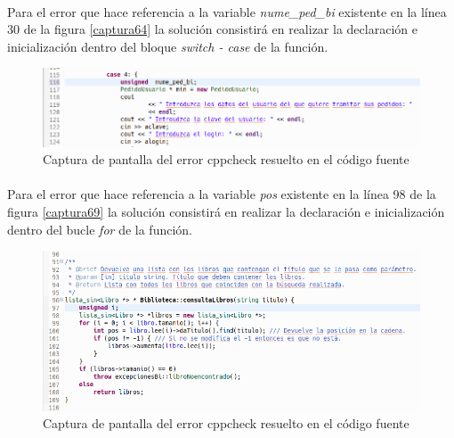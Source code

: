 			\paragraph{}Para el error que hace referencia a la variable \textit{nume\_ped\_bi} existente en la línea 30 de la figura \ref*{captura64} la solución consistirá en realizar la declaración e inicialización dentro del bloque \textit{switch - case} de la función.
			
			\begin{figure}[H]
				\centering
				\includegraphics[scale=0.5]{img/captura80.png}
				\caption{Captura de pantalla del error cppcheck  resuelto en el código fuente}
				\label{captura80}
			\end{figure}
		
			\paragraph{}Para el error que hace referencia a la variable \textit{pos} existente en la línea 98 de la figura \ref*{captura69} la solución consistirá en realizar la declaración e inicialización dentro del bucle \textit{for} de la función.
			
			\begin{figure}[H]
				\centering
				\includegraphics[scale=0.55]{img/captura81.png}
				\caption{Captura de pantalla del error cppcheck  resuelto en el código fuente}
				\label{captura81}
			\end{figure}
\newpage